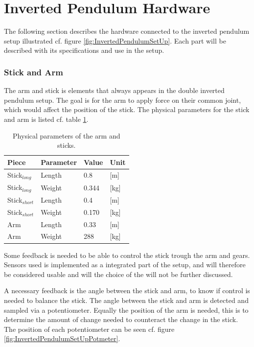 \section{Inverted Pendulum Hardware}
The following section describes the hardware connected to the inverted pendulum setup illustrated cf. figure \ref{fig:InvertedPendulumSetUp}.
Each part will be described with its specifications and use in the setup.

\subsubsection{Stick and Arm}
The arm and stick is elements that always appears in the double inverted pendulum setup. The goal is for the arm to apply force on their common joint, which would affect the position of the stick. The physical parameters for the stick and arm is listed cf. table \ref{DimensionsStick}.

\begin{table}[htbp]
\centering
\begin{tabular}{llll}
\hline
Piece           & Parameter & Value & Unit \\ \hline
Stick$_{long}$  & Length    & 0.8   & [m]    \\
Stick$_{long}$  & Weight    & 0.344 & [kg]    \\ 
Stick$_{short}$ & Length    & 0.4   & [m]    \\
Stick$_{short}$ & Weight    & 0.170 & [kg]    \\ 
Arm             & Length    & 0.33  & [m]    \\
Arm             & Weight    & 288   & [kg]   \\ 
\end{tabular}
\caption{Physical parameters of the arm and sticks.}
\label{DimensionsStick}
\end{table}

Some feedback is needed to be able to control the stick trough the arm and gears. Sensors used is implemented as a integrated part of the setup, and will therefore be considered usable and will the choice of the will not be further discussed.

A necessary feedback is the angle between the stick and arm, to know if control is needed to balance the stick. The angle between the stick and arm is detected and sampled via a potentiometer. Equally the position of the arm is needed, this is to determine the amount of change needed to counteract the change in the stick. The position of each potentiometer can be seen cf. figure \ref{fig:InvertedPendulumSetUpPotmeter}. 


